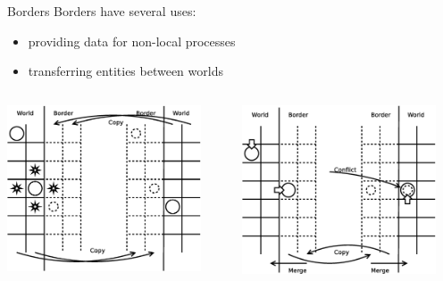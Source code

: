 \documentclass{beamer}
\begin{document}
\begin{frame}{Borders}
    Borders have several uses:
    \begin{itemize}
        \item providing data for non-local processes
        \item transferring entities between worlds
    \end{itemize}
    \begin{columns}
        \begin{column}{.5\textwidth}
            \includegraphics[width=0.9\textwidth]{border1}
        \end{column}
        \begin{column}{.5\textwidth}
            \includegraphics[width=0.9\textwidth]{border2}
        \end{column}
    \end{columns}
\end{frame}
\end{document}
